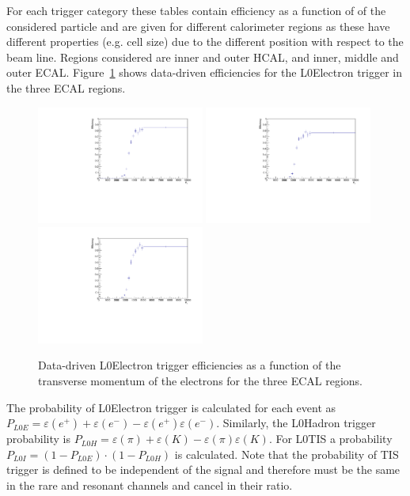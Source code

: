 For each trigger category these tables contain efficiency as a function of
\pt of the considered particle and are given for different calorimeter regions
as these have different properties (e.g. cell size) due to the different position
with respect to the beam line. Regions considered are inner and outer HCAL, and inner, middle and outer ECAL.
Figure~\ref{sec:L0eff_tables} shows data-driven efficiencies for the L0Electron trigger
in the three ECAL regions.
%
\begin{figure}[h!]
\centering
\includegraphics[width=0.49\textwidth]{RKst/figs/l0plots/l0E_Inner.pdf}
\includegraphics[width=0.49\textwidth]{RKst/figs/l0plots/l0E_Middle.pdf}
\includegraphics[width=0.49\textwidth]{RKst/figs/l0plots/l0E_Outer.pdf}
\caption{Data-driven L0Electron trigger efficiencies as a function of the transverse momentum
of the electrons for the three ECAL regions.}
\label{sec:L0eff_tables}
\end{figure}

The probability of L0Electron trigger is calculated for each event as $P_{L0E} = \varepsilon(e^+) + \varepsilon(e^-) - \varepsilon(e^+)\varepsilon(e^-)$.
Similarly, the L0Hadron trigger probability is $P_{L0H} = \varepsilon(\pi) + \varepsilon(K) - \varepsilon(\pi)\varepsilon(K)$.
For L0TIS a probability $P_{L0I} = (1-P_{L0E})\cdot(1-P_{L0H})$ is calculated.
Note that the probability of TIS trigger is defined to be independent of the signal and therefore must
be the same in the rare and resonant channels and cancel in their ratio.

